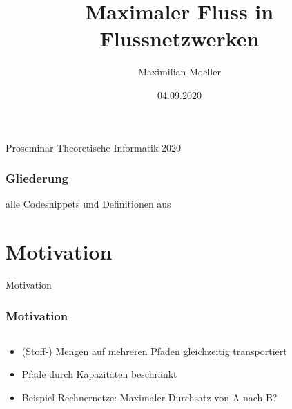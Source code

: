 \documentclass{beamer}
\author{Maximilian Moeller}
\title{Maximaler Fluss in Flussnetzwerken}
\date{04.09.2020}
\begin{document}
\begin{frame}
\maketitle
\center\large Proseminar Theoretische Informatik 2020
\end{frame}

\begin{frame}
\frametitle{Gliederung}
\tableofcontents
{}
alle Codesnippets und Definitionen aus \citep{Cormen09}
\end{frame}

\section*{Motivation}
\begin{frame}[plain]
\begin{center}
\begin{LARGE}
Motivation
\end{LARGE}
\end{center}
\end{frame}

\begin{frame}
\frametitle{Motivation}
\begin{columns}
\begin{column}{.4\textwidth}
\begin{itemize}
\item (Stoff-) Mengen auf mehreren Pfaden gleichzeitig transportiert
\item Pfade durch Kapazitäten beschränkt\pause
\item Beispiel Rechnernetze: Maximaler Durchsatz von A nach B?
\end{itemize}
\end{column}
\begin{column}{.6\textwidth}
\end{column}
\end{columns}
\end{frame}
\end{document}
